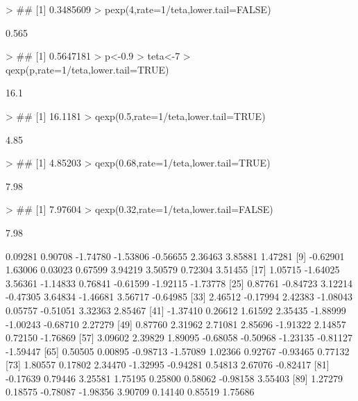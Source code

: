 \documentclass{article}
\begin{document}
\begin{Schunk}
\begin{Sinput}
> ## [1] 0.3485609
> pexp(4,rate=1/teta,lower.tail=FALSE)
\end{Sinput}
\begin{Soutput}
[1] 0.565
\end{Soutput}
\begin{Sinput}
> ## [1] 0.5647181
> p<-0.9
> teta<-7
> qexp(p,rate=1/teta,lower.tail=TRUE)
\end{Sinput}
\begin{Soutput}
[1] 16.1
\end{Soutput}
\begin{Sinput}
> ## [1] 16.1181
> qexp(0.5,rate=1/teta,lower.tail=TRUE)
\end{Sinput}
\begin{Soutput}
[1] 4.85
\end{Soutput}
\begin{Sinput}
> ## [1] 4.85203
> qexp(0.68,rate=1/teta,lower.tail=TRUE)
\end{Sinput}
\begin{Soutput}
[1] 7.98
\end{Soutput}
\begin{Sinput}
> ## [1] 7.97604
> qexp(0.32,rate=1/teta,lower.tail=FALSE)
\end{Sinput}
\begin{Soutput}
[1] 7.98
\end{Soutput}
\begin{Soutput}
  [1]  0.09281  0.90708 -1.74780 -1.53806 -0.56655  2.36463  3.85881  1.47281
  [9] -0.62901  1.63006  0.03023  0.67599  3.94219  3.50579  0.72304  3.51455
 [17]  1.05715 -1.64025  3.56361 -1.14833  0.76841 -0.61599 -1.92115 -1.73778
 [25]  0.87761 -0.84723  3.12214 -0.47305  3.64834 -1.46681  3.56717 -0.64985
 [33]  2.46512 -0.17994  2.42383 -1.08043  0.05757 -0.51051  3.32363  2.85467
 [41] -1.37410  0.26612  1.61592  2.35435 -1.88999 -1.00243 -0.68710  2.27279
 [49]  0.87760  2.31962  2.71081  2.85696 -1.91322  2.14857  0.72150 -1.76869
 [57]  3.09602  2.39829  1.89095 -0.68058 -0.50968 -1.23135 -0.81127 -1.59447
 [65]  0.50505  0.00895 -0.98713 -1.57089  1.02366  0.92767 -0.93465  0.77132
 [73]  1.80557  0.17802  2.34470 -1.32995 -0.94281  0.54813  2.67076 -0.82417
 [81] -0.17639  0.79446  3.25581  1.75195  0.25800  0.58062 -0.98158  3.55403
 [89]  1.27279  0.18575 -0.78087 -1.98356  3.90709  0.14140  0.85519  1.75686

\end{Soutput}
\end{Schunk}
\end{document}

